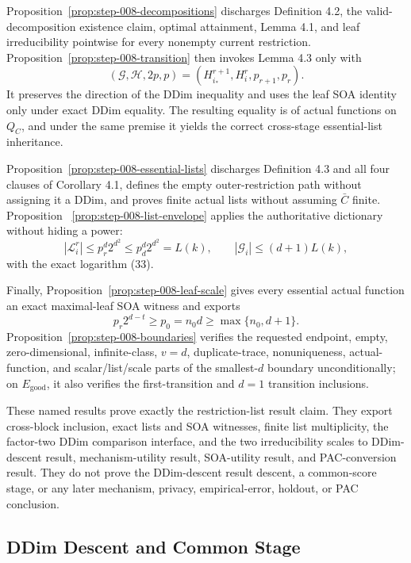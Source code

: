 Proposition~\ref{prop:step-008-decompositions} discharges Definition 4.2,
the valid-decomposition existence claim, optimal attainment, Lemma 4.1,
and leaf irreducibility pointwise for every nonempty current restriction.
Proposition~\ref{prop:step-008-transition} then invokes Lemma 4.3 only with
\[
 (\mathcal G,\mathcal H,2p,p)
 =(H_{i_*}^{r+1},H_i^r,p_{r+1},p_r).
\]
It preserves the direction of the DDim inequality and uses the leaf SOA
identity only under exact DDim equality. The resulting equality is of
actual functions on \(Q_C\), and under the same premise it yields the
correct cross-stage essential-list inheritance.

Proposition~\ref{prop:step-008-essential-lists} discharges Definition 4.3
and all four clauses of Corollary 4.1, defines the empty outer-restriction
path without assigning it a DDim, and proves finite actual lists without
assuming \(\bar C\) finite. Proposition
~\ref{prop:step-008-list-envelope} applies the authoritative dictionary
without hiding a power:
\[
 |\mathcal L_i^r|\le p_r^d2^{d^2}
 \le p_d^d2^{d^2}=L(k),
 \qquad
 |\mathcal G_i|\le(d+1)L(k),
\]
with the exact logarithm (33).

Finally, Proposition~\ref{prop:step-008-leaf-scale} gives every essential
actual function an exact maximal-leaf SOA witness and exports
\[
 p_r2^{d-t}\ge p_0=n_0d\ge\max\{n_0,d+1\}.
\]
Proposition~\ref{prop:step-008-boundaries} verifies the requested endpoint,
empty, zero-dimensional, infinite-class, \(v=d\), duplicate-trace,
nonuniqueness, actual-function, and scalar/list/scale parts of the
smallest-\(d\) boundary unconditionally; on \(E_{\mathrm{good}}\), it also
verifies the first-transition and \(d=1\) transition inclusions.

These named results prove exactly the restriction-list result claim. They export
cross-block inclusion, exact lists and SOA witnesses, finite list
multiplicity, the factor-two DDim comparison interface, and the two
irreducibility scales to DDim-descent result, mechanism-utility result, SOA-utility result, and PAC-conversion result. They
do not prove the DDim-descent result descent, a common-score stage, or any later
mechanism, privacy, empirical-error, holdout, or PAC conclusion.



\subsection{DDim Descent and Common Stage}\label{app:step_009}

